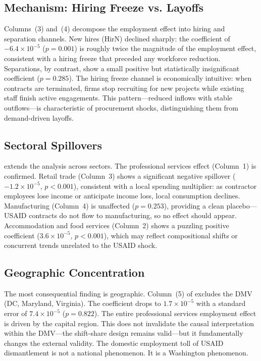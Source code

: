 \documentclass[12pt]{article}
\begin{document}
\subsection{Mechanism: Hiring Freeze vs. Layoffs}

Columns~(3) and~(4) decompose the employment effect into hiring and separation channels. New hires (HirN) declined sharply: the coefficient of $-6.4 \times 10^{-5}$ ($p = 0.001$) is roughly twice the magnitude of the employment effect, consistent with a hiring freeze that preceded any workforce reduction. Separations, by contrast, show a small positive but statistically insignificant coefficient ($p = 0.285$). The hiring freeze channel is economically intuitive: when contracts are terminated, firms stop recruiting for new projects while existing staff finish active engagements. This pattern---reduced inflows with stable outflows---is characteristic of procurement shocks, distinguishing them from demand-driven layoffs.

\subsection{Sectoral Spillovers}

{\small}

 extends the analysis across sectors. The professional services effect (Column~1) is confirmed. Retail trade (Column~3) shows a significant negative spillover ($-1.2 \times 10^{-5}$, $p < 0.001$), consistent with a local spending multiplier: as contractor employees lose income or anticipate income loss, local consumption declines. Manufacturing (Column~4) is unaffected ($p = 0.253$), providing a clean placebo---USAID contracts do not flow to manufacturing, so no effect should appear. Accommodation and food services (Column~2) shows a puzzling positive coefficient ($3.6 \times 10^{-5}$, $p < 0.001$), which may reflect compositional shifts or concurrent trends unrelated to the USAID shock.

\subsection{Geographic Concentration}

The most consequential finding is geographic. Column~(5) of  excludes the DMV (DC, Maryland, Virginia). The coefficient drops to $1.7 \times 10^{-5}$ with a standard error of $7.4 \times 10^{-5}$ ($p = 0.822$). The entire professional services employment effect is driven by the capital region. This does not invalidate the causal interpretation within the DMV---the shift-share design remains valid---but it fundamentally changes the external validity. The domestic employment toll of USAID dismantlement is not a national phenomenon. It is a Washington phenomenon.
\end{document}
